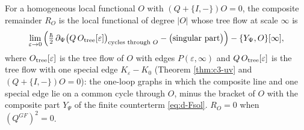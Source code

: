 \begin{definition}
\label{def:d-RO}
For a homogeneous local functional $O$ with $(Q+\{I,-\})O=0$, the composite remainder $R_O$ is the local functional of degree $|O|$ whose tree flow at scale $\infty$ is
\[
\lim_{\varepsilon\to0}\Big(\tfrac\hbar2\,\partial_\Psi\big(Q\,O_{\rm tree}[\varepsilon]\big)_{\text{cycles through }O}-\big(\text{singular part}\big)\Big)-\{Y_\Psi,O\}[\infty],
\]
where $O_{\rm tree}[\varepsilon]$ is the tree flow of $O$ with edges $P(\varepsilon,\infty)$ and $Q\,O_{\rm tree}[\varepsilon]$ is the tree flow with one special edge $K_\varepsilon-K_0$ (Theorem \ref{thm:c3-uv} and $(Q+\{I,-\})O=0$): the one-loop graphs in which the composite line and one special edge lie on a common cycle through $O$, minus the bracket of $O$ with the composite part $Y_\Psi$ of the finite counterterm \eqref{eq:d-Fsol}. $R_O=0$ when $(Q^{GF})^2=0$.
\end{definition}

